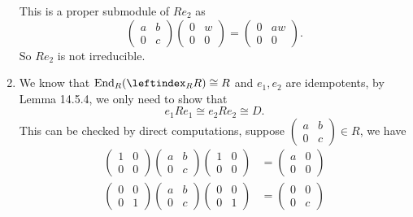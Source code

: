 \documentclass[a4paper, 12pt]{article}
\begin{document}
\begin{solution}
\begin{enumerate}[(1)]
This is a proper submodule of \(Re_2\) as 
\[\begin{pmatrix}
    a&b\\ 
    0&c
\end{pmatrix}\begin{pmatrix}
    0&w\\ 
    0&0
\end{pmatrix}=\begin{pmatrix}
    0&aw\\ 
    0&0
\end{pmatrix}.\]
So \(Re_2\) is not irreducible.
\item We know that \(\text{End}_R(\leftindex_R R)\cong R\) and \(e_1,e_2\) are idempotents, by Lemma 14.5.4, we only need to show that 
\[e_1Re_1\cong e_2Re_2\cong D.\]
This can be checked by direct computations, suppose \(\begin{pmatrix}
    a&b\\ 
    0&c
\end{pmatrix}\in R\), we have 
\begin{align*}
    \begin{pmatrix}
        1&0\\ 
        0&0
    \end{pmatrix}\begin{pmatrix}
        a&b\\ 
        0&c
    \end{pmatrix}\begin{pmatrix}
        1&0\\ 
        0&0
    \end{pmatrix}&=\begin{pmatrix}
        a&0\\ 
        0&0
    \end{pmatrix}\\[5pt]
    \begin{pmatrix}
        0&0\\ 
        0&1
    \end{pmatrix}\begin{pmatrix}
        a&b\\ 
        0&c
    \end{pmatrix}\begin{pmatrix}
        0&0\\ 
        0&1
    \end{pmatrix}&=\begin{pmatrix}
        0&0\\ 
        0&c
    \end{pmatrix}
\end{align*}

\end{enumerate}
\end{solution}
\end{document}
